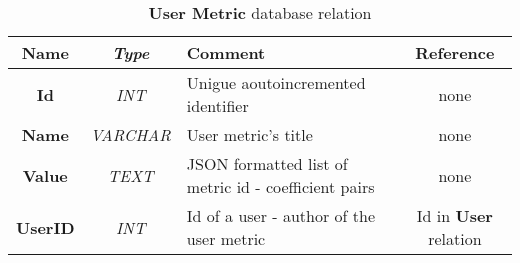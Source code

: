 	\begin{table}[t!]
		\centering
		\begin{tabular}{| >{\bf}c | >{\em}c | l | c |} 
			\hline
			Name	& Type			& Comment												& Reference						\\ \hline
			Id		& INT			& Unigue aoutoincremented identifier					& none							\\
			Name	& VARCHAR		& User metric's title									& none							\\
			Value	& TEXT			& JSON formatted list of metric id - coefficient pairs	& none							\\
			UserID	& INT			& Id of a user - author of the user metric				& Id in \textbf{User} relation	\\
			\hline
		\end{tabular}
		\caption{\textbf{User Metric} database relation}
		\label{umetrictable}
	\end{table}